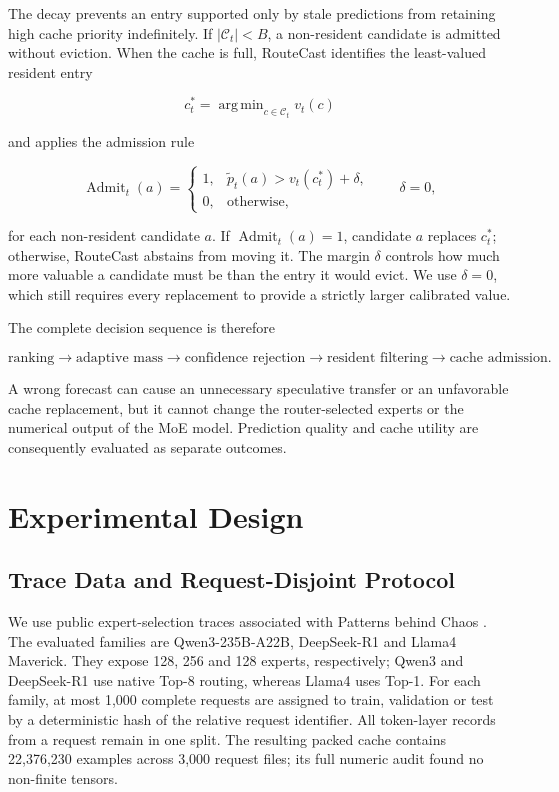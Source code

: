 \documentclass[conference]{IEEEtran}
\DeclareMathOperator*{\argmin}{arg\,min}
\begin{document}
The decay prevents an entry supported only by stale predictions from retaining
high cache priority indefinitely. If
\(|\mathcal{C}_t|<B\), a non-resident candidate is admitted without eviction.
When the cache is full, RouteCast identifies the least-valued resident entry

\begin{equation}
c_t^*
=
\argmin_{c\in\mathcal{C}_t}v_t(c)
\label{eq:cache-victim}
\end{equation}

and applies the admission rule

\begin{equation}
\operatorname{Admit}_t(a)
=
\begin{cases}
1,
&
\widetilde{p}_t(a)
>
v_t(c_t^*)+\delta, \\[2pt]
0,
&
\text{otherwise},
\end{cases}
\qquad
\delta=0,
\label{eq:cache-admission}
\end{equation}

for each non-resident candidate \(a\). If
\(\operatorname{Admit}_t(a)=1\), candidate \(a\) replaces \(c_t^*\);
otherwise, RouteCast abstains from moving it. The margin \(\delta\) controls
how much more valuable a candidate must be than the entry it would evict. We
use \(\delta=0\), which still requires every replacement to provide a strictly
larger calibrated value.

The complete decision sequence is therefore

\begin{equation}
\text{ranking}
\rightarrow
\text{adaptive mass}
\rightarrow
\text{confidence rejection}
\rightarrow
\text{resident filtering}
\rightarrow
\text{cache admission}.
\label{eq:selective-pipeline}
\end{equation}

A wrong forecast can cause an unnecessary speculative transfer or an
unfavorable cache replacement, but it cannot change the router-selected
experts or the numerical output of the MoE model. Prediction quality and cache
utility are consequently evaluated as separate outcomes.

\section{Experimental Design}
\subsection{Trace Data and Request-Disjoint Protocol}
We use public expert-selection traces associated with Patterns behind Chaos \cite{patterns}. The evaluated families are Qwen3-235B-A22B, DeepSeek-R1 and Llama4 Maverick. They expose 128, 256 and 128 experts, respectively; Qwen3 and DeepSeek-R1 use native Top-8 routing, whereas Llama4 uses Top-1. For each family, at most 1,000 complete requests are assigned to train, validation or test by a deterministic hash of the relative request identifier. All token-layer records from a request remain in one split. The resulting packed cache contains 22,376,230 examples across 3,000 request files; its full numeric audit found no non-finite tensors.
\end{document}
